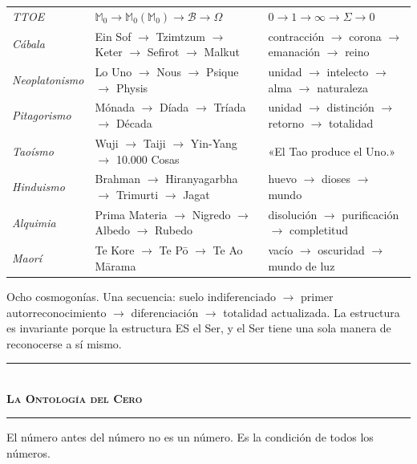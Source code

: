 \documentclass[10pt, openany, oneside]{book}
\renewcommand{\normalsize}{\fontsize{10}{13}\selectfont}
\renewcommand{\footnotesize}{\fontsize{8.5}{11}\selectfont}
\begin{document}
{\footnotesize
\noindent\begin{tabular}{l p{} p{}}
\textit{TTOE} & $\mathbb{M}_0 \to \mathbb{M}_0(\mathbb{M}_0) \to \mathcal{B} \to \Omega$ & $0 \to 1 \to \infty \to \Sigma \to 0$ \\[0.3em]
\textit{Cábala} & Ein Sof $\to$ Tzimtzum $\to$ Keter $\to$ Sefirot $\to$ Malkut & contracción $\to$ corona $\to$ emanación $\to$ reino \\[0.3em]
\textit{Neoplatonismo} & Lo Uno $\to$ Nous $\to$ Psique $\to$ Physis & unidad $\to$ intelecto $\to$ alma $\to$ naturaleza \\[0.3em]
\textit{Pitagorismo} & Mónada $\to$ Díada $\to$ Tríada $\to$ Década & unidad $\to$ distinción $\to$ retorno $\to$ totalidad \\[0.3em]
\textit{Taoísmo} & Wuji $\to$ Taiji $\to$ Yin-Yang $\to$ 10.000 Cosas & «El Tao produce el Uno.» \\[0.3em]
\textit{Hinduismo} & Brahman $\to$ Hiranyagarbha $\to$ Trimurti $\to$ Jagat & huevo $\to$ dioses $\to$ mundo \\[0.3em]
\textit{Alquimia} & Prima Materia $\to$ Nigredo $\to$ Albedo $\to$ Rubedo & disolución $\to$ purificación $\to$ completitud \\[0.3em]
\textit{Maorí} & Te Kore $\to$ Te P\={o} $\to$ Te Ao M\={a}rama & vacío $\to$ oscuridad $\to$ mundo de luz \\[0.3em]
\end{tabular}
}

\vspace{0.5em}

\noindent Ocho cosmogonías. Una secuencia: suelo indiferenciado $\to$ primer autorreconocimiento $\to$ diferenciación $\to$ totalidad actualizada. La estructura es invariante porque la estructura ES el Ser, y el Ser tiene una sola manera de reconocerse a sí mismo.

\vspace{1em}

\begin{center}
    \rule{0.3\textwidth}{0.4pt}\\[0.5em]
    {\normalsize\bfseries\scshape La Ontología del Cero}\\[0.3em]
    \rule{0.3\textwidth}{0.4pt}
\end{center}

\vspace{0.8em}

\noindent El número antes del número no es un número. Es la condición de todos los números.
\end{document}
